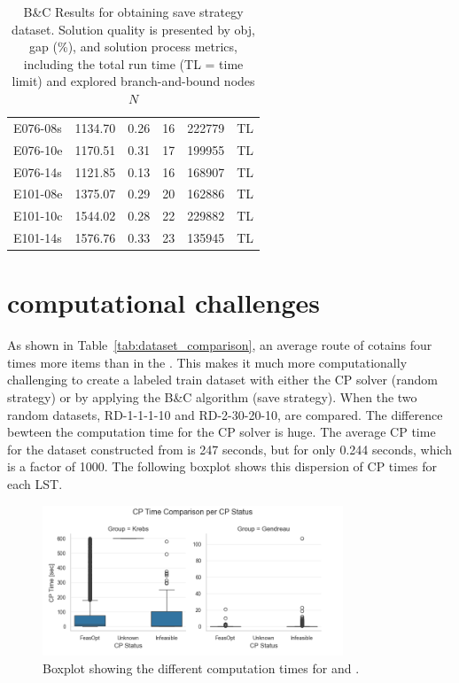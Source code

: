 \begin{table}
\begin{tabular}{lrrrrl}
        E076-08s & 1134.70 & 0.26 & 16           & 222779  & TL      \\
        E076-10e & 1170.51 & 0.31 & 17           & 199955  & TL      \\
        E076-14s & 1121.85 & 0.13 & 16           & 168907  & TL      \\
        E101-08e & 1375.07 & 0.29 & 20           & 162886  & TL      \\
        E101-10c & 1544.02 & 0.28 & 22           & 229882  & TL      \\
        E101-14s & 1576.76 & 0.33 & 23           & 135945  & TL      \\
        \bottomrule
    \end{tabular}
    \caption{B\&C Results for obtaining save strategy dataset. Solution quality is presented by obj, gap (\%),
        and solution process metrics, including the total run time (TL = time limit) and explored branch-and-bound nodes $N$}
    \label{tab:bc_results_gendreau}
\end{table}

\clearpage
\section{\krebsADataSetText computational challenges}
\label{app:sec:krebs_computationally_challenges}

As shown in Table~\ref{tab:dataset_comparison}, an average route of \krebsADataSetText cotains four times more items than
in the \gendreauDataSet. This makes it much more computationally challenging to create a labeled train dataset with either
the \gls{CP} solver (random strategy) or by applying the B\&C algorithm (save strategy). When the two random datasets, RD-1-1-1-10
and RD-2-30-20-10, are compared. The difference bewteen the computation time for the \gls{CP} solver is huge. The average
\gls{CP} time for the dataset constructed from \krebsADataSetText is 247 seconds, but for \gendreauDataSetText only 0.244 seconds,
which is a factor of 1000. The following boxplot shows this dispersion of \gls{CP} times for each \gls{LST}.
\begin{figure}[ht]
    \centering
    \includegraphics[width=0.8\textwidth]{pictures/comparison_krebs_gendreau/boxplot_cp_time.png}
    \caption{Boxplot showing the different computation times for \krebsADataSetText and \gendreauDataSet.}
    \label{fig:comparison_krebs_gendreau_boxplot}
\end{figure}

